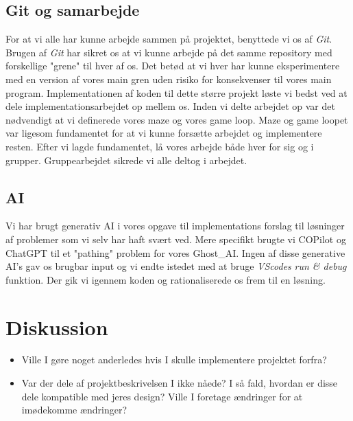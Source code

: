 \documentclass{article}
\theoremstyle{mytheoremstyle}
\theoremstyle{mytheoremstyle}
\theoremstyle{myproblemstyle}
\begin{document}
\subsection{Git og samarbejde}
For at vi alle har kunne arbejde sammen på projektet, benyttede vi os af
\textit{Git}. Brugen af \textit{Git} har sikret os at vi kunne arbejde på det samme
repository med forskellige "grene" til hver af os. Det betød at vi hver har
kunne eksperimentere med en version af vores main gren uden risiko for
konsekvenser til vores main program. Implementationen af koden til dette større
projekt løste vi bedst ved at dele implementationsarbejdet op mellem os. Inden
vi delte arbejdet op var det nødvendigt at vi definerede vores maze og vores
game loop. Maze og game loopet var ligesom fundamentet for at vi kunne forsætte
arbejdet og implementere resten. Efter vi lagde fundamentet, lå vores arbejde
både hver for sig og i grupper. Gruppearbejdet sikrede vi alle deltog i
arbejdet.

\subsection{AI}
Vi har brugt generativ AI i vores opgave til implementations forslag til
løsninger af problemer som vi selv har haft svært ved. Mere specifikt brugte vi
COPilot og ChatGPT til et "pathing" problem for vores Ghost\_AI. Ingen af disse
generative AI's gav os brugbar input og vi endte istedet med at bruge
\textit{VScodes} \textit{run \& debug} funktion. Der gik vi igennem koden og
rationaliserede os frem til en løsning.


\section{Diskussion}\label{sec:Diskussion} %
\begin{itemize}
  \item Ville I gøre noget anderledes hvis I skulle implementere projektet
  forfra?
  \item Var der dele af projektbeskrivelsen I ikke nåede? I så fald, hvordan er
  disse dele kompatible med jeres design? Ville I foretage ændringer for at
  imødekomme ændringer?
\end{itemize}
\end{document}

